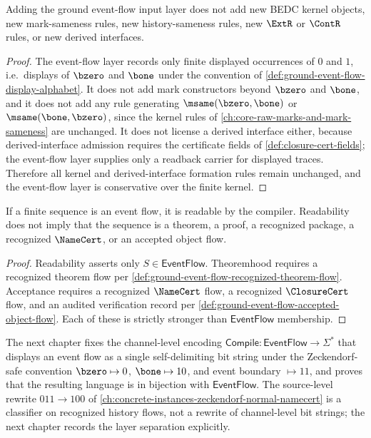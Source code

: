 \begin{theorem}
\label{thm:ground-event-flow-conservativity}
Adding the ground event-flow input layer does not add new BEDC kernel objects, new mark-sameness rules, new history-sameness rules, new $\ExtR$ or $\ContR$ rules, or new derived interfaces.
\end{theorem}

\begin{proof}
The event-flow layer records only finite displayed occurrences of $0$ and $1$, i.e.\ displays of $\bzero$ and $\bone$ under the convention of \autoref{def:ground-event-flow-display-alphabet}. It does not add mark constructors beyond $\bzero$ and $\bone$, and it does not add any rule generating $\msame(\bzero, \bone)$ or $\msame(\bone, \bzero)$, since the kernel rules of \autoref{ch:core-raw-marks-and-mark-sameness} are unchanged. It does not license a derived interface either, because derived-interface admission requires the certificate fields of \autoref{def:closure-cert-fields}; the event-flow layer supplies only a readback carrier for displayed traces. Therefore all kernel and derived-interface formation rules remain unchanged, and the event-flow layer is conservative over the finite kernel.
\end{proof}

\begin{corollary}
\label{cor:ground-event-flow-readability-weaker-than-theoremhood}
If a finite sequence is an event flow, it is readable by the compiler. Readability does not imply that the sequence is a theorem, a proof, a recognized package, a recognized $\NameCert$, or an accepted object flow.
\end{corollary}

\begin{proof}
Readability asserts only $S \in \mathsf{EventFlow}$. Theoremhood requires a recognized theorem flow per \autoref{def:ground-event-flow-recognized-theorem-flow}. Acceptance requires a recognized $\NameCert$ flow, a recognized $\ClosureCert$ flow, and an audited verification record per \autoref{def:ground-event-flow-accepted-object-flow}. Each of these is strictly stronger than $\mathsf{EventFlow}$ membership.
\end{proof}

\begin{remark}[Outlook]
\label{rem:ground-event-flow-outlook}
The next chapter fixes the channel-level encoding $\mathsf{Compile} \colon \mathsf{EventFlow} \to \Sigma^{*}$ that displays an event flow as a single self-delimiting bit string under the Zeckendorf-safe convention $\bzero \mapsto 0$, $\bone \mapsto 10$, and event boundary $\mapsto 11$, and proves that the resulting language is in bijection with $\mathsf{EventFlow}$. The source-level rewrite $011 \to 100$ of \autoref{ch:concrete-instances-zeckendorf-normal-namecert} is a classifier on recognized history flows, not a rewrite of channel-level bit strings; the next chapter records the layer separation explicitly.
\end{remark}
